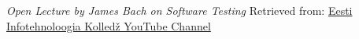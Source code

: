     \emph{Open Lecture by James Bach on Software Testing}
    \newline
    Retrieved from: \href{https://www.youtube.com/watch?v=ILkT_HV9DVU}{Eesti Infotehnoloogia Kolledž YouTube Channel}
